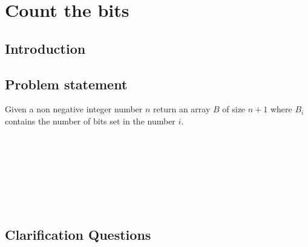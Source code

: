 %



\chapter{Count the bits}
\label{ch:count_bits}
\section*{Introduction}

\section{Problem statement}
\begin{exercise}
\label{example:count_bits:exercice1}
Given a non negative integer number $n$
return an array $B$ of size $n+1$ where $B_i$ contains the 
number of bits set in the number $i$.
	\begin{example}
		\label{example:count_bits:example1}
		\hfill \\
	
		
	\end{example}

	\begin{example}
		\label{example:count_bits:example2}
		\hfill \
		
	\end{example}

	\begin{example}
		\hfill \
	
	\label{ex:count_bits:example3}
	\end{example}

	\begin{example}
		\hfill \

	\label{ex:count_bits:example4}	
	\end{example}
\end{exercise}

\section{Clarification Questions}

